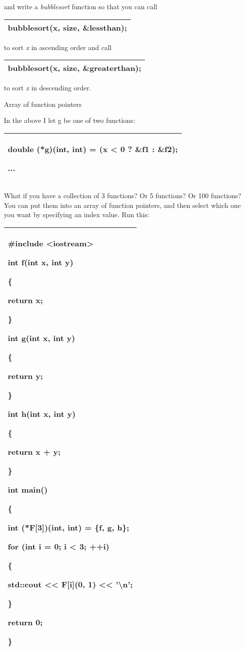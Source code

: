 \documentclass[
]{article}
\begin{document}
and write a \emph{bubblesort} function so that you can call

\begin{longtable}[]{@{}l@{}}
\toprule
\endhead
bubblesort(x, size, \&lessthan);\tabularnewline
\bottomrule
\end{longtable}

to sort \emph{x} in ascending order and call

\begin{longtable}[]{@{}l@{}}
\toprule
\endhead
bubblesort(x, size, \&greaterthan);\tabularnewline
\bottomrule
\end{longtable}

to sort \emph{x} in descending order.

Array of function pointers

In the above I let g be one of two functions:

\begin{longtable}[]{@{}l@{}}
\toprule
\endhead
\begin{minipage}[t]{0.97\columnwidth}\raggedright
double (*g)(int, int) = (x \textless{} 0 ? \&f1 : \&f2);

...\strut
\end{minipage}\tabularnewline
\bottomrule
\end{longtable}

What if you have a collection of 3 functions? Or 5 functions? Or 100
functions? You can put them into an array of function pointers, and then
select which one you want by specifying an index value. Run this:

\begin{longtable}[]{@{}l@{}}
\toprule
\endhead
\begin{minipage}[t]{0.97\columnwidth}\raggedright
\#include \textless iostream\textgreater{}

int f(int x, int y)

\{

return x;

\}

int g(int x, int y)

\{

return y;

\}

int h(int x, int y)

\{

return x + y;

\}

int main()

\{

\textbf{int (*F{[}3{]})(int, int)} = \{f, g, h\};

for (int i = 0; i \textless{} 3; ++i)

\{

std::cout \textless\textless{} F{[}i{]}(0, 1) \textless\textless{}
'\textbackslash n';

\}

return 0;

\}\strut
\end{minipage}\tabularnewline
\bottomrule
\end{longtable}
\end{document}
